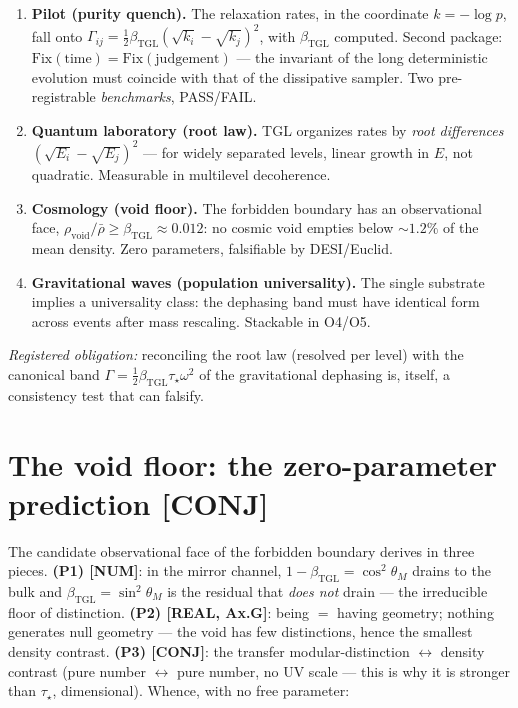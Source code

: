 \documentclass[11pt]{article}
\newcommand{\bTGL}{\beta_{\mathrm{TGL}}}\newcommand{\Msun}{M_{\odot}}\newcommand{\TGL}{\mathrm{TGL}}
\theoremstyle{definition}\newtheorem{deriv}{Derivation}
\begin{document}
\begin{enumerate}

\item \textbf{Pilot (purity quench).} The relaxation rates, in the coordinate $k=-\log p$, fall onto $\Gamma_{ij}=\tfrac12\bTGL(\sqrt{k_i}-\sqrt{k_j})^2$, with $\bTGL$ computed. Second package: $\mathrm{Fix}(\text{time})=\mathrm{Fix}(\text{judgement})$ --- the invariant of the long deterministic evolution must coincide with that of the dissipative sampler. Two pre-registrable \emph{benchmarks}, PASS/FAIL.

\item \textbf{Quantum laboratory (root law).} TGL organizes rates by \emph{root differences} $(\sqrt{E_i}-\sqrt{E_j})^2$ --- for widely separated levels, linear growth in $E$, not quadratic. Measurable in multilevel decoherence.

\item \textbf{Cosmology (void floor).} The forbidden boundary has an observational face, $\rho_{\mathrm{void}}/\bar\rho\geq\bTGL\approx0.012$: no cosmic void empties below $\sim1.2\%$ of the mean density. Zero parameters, falsifiable by DESI/Euclid.

\item \textbf{Gravitational waves (population universality).} The single substrate implies a universality class: the dephasing band must have identical form across events after mass rescaling. Stackable in O4/O5.

\end{enumerate}

\emph{Registered obligation:} reconciling the root law (resolved per level) with the canonical band $\Gamma=\tfrac12\bTGL\tau_\star\omega^2$ of the gravitational dephasing is, itself, a consistency test that can falsify.

\section{The void floor: the zero-parameter prediction \textsf{[CONJ]}}

The candidate observational face of the forbidden boundary derives in three pieces. \textbf{(P1) \textsf{[NUM]}}: in the mirror channel, $1-\bTGL=\cos^2\theta_M$ drains to the bulk and $\bTGL=\sin^2\theta_M$ is the residual that \emph{does not} drain --- the irreducible floor of distinction. \textbf{(P2) \textsf{[REAL, Ax.G]}}: being $=$ having geometry; nothing generates null geometry --- the void has few distinctions, hence the smallest density contrast. \textbf{(P3) \textsf{[CONJ]}}: the transfer modular-distinction $\leftrightarrow$ density contrast (pure number $\leftrightarrow$ pure number, no UV scale --- this is why it is stronger than $\tau_\star$, dimensional). Whence, with no free parameter:
\end{document}
